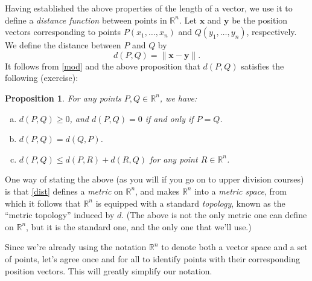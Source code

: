 \documentclass[12pt,letterpaper]{article}
\newtheorem{proposition}[theorem]{Proposition}
\newcommand{\R}{\mathbb{R}}
\newcommand{\len}[1]{\lVert#1\rVert}
\newcommand{\x}{\mathbf{x}}
\newcommand{\y}{\mathbf{y}}
\begin{document}
Having established the above properties of the length of a vector, we use it to define a {\em distance function} between points in $\R^n$. Let $\x$ and $\y$ be the position vectors corresponding to points $P(x_1,\ldots, x_n)$ and $Q(y_1,\ldots, y_n)$, respectively. We define the distance between $P$ and $Q$ by \begin{equation}\label{dist}
d(P,Q)=\len{\x-\y}.
\end{equation}
It follows from \eqref{mod} and the above proposition that $d(P,Q)$ satisfies the following (exercise):
\begin{proposition}
For any points $P,Q\in \R^n$, we have:
\begin{enumerate}[(a)]
\item $d(P,Q)\geq 0$, and $d(P,Q)=0$ if and only if $P=Q$.
\item $d(P,Q)=d(Q,P)$.
\item $d(P,Q)\leq d(P,R)+d(R,Q)$ for any point $R\in \R^n$.
\end{enumerate}
\end{proposition}
One way of stating the above (as you will if you go on to upper division courses) is that \eqref{dist} defines a {\em metric} on $\R^n$, and makes $\R^n$ into a {\em metric space}, from which it follows that $\R^n$ is equipped with a standard {\em topology}, known as the ``metric topology'' induced by $d$. (The above is not the only metric one can define on $\R^n$, but it is the standard one, and the only one that we'll use.)

Since we're already using the notation $\R^n$ to denote both a vector space and a set of points, let's agree once and for all to identify points with their corresponding position vectors. This will greatly simplify our notation.
\end{document}
